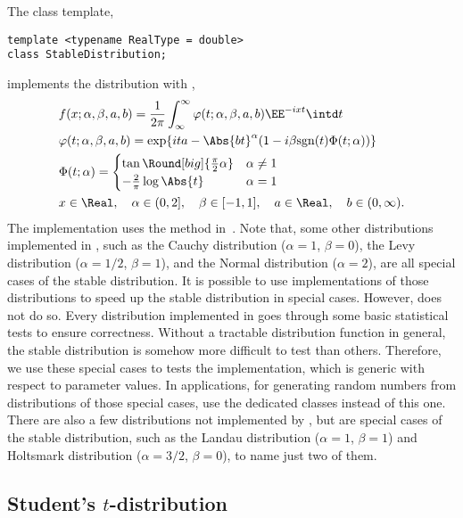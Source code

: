 The class template,
\begin{verbatim}
template <typename RealType = double>
class StableDistribution;
\end{verbatim}
implements the distribution with \pdf,
\begin{align*}
  &f(x;\alpha,\beta,a,b) =
  \frac{1}{2\pi}\int_{\infty}^{\infty}
  \varphi(t;\alpha,\beta,a,b)\EE^{-ixt}\intd t\\
  &\varphi(t;\alpha,\beta,a,b) =
  \exp\{ita - \Abs{bt}^{\alpha}(1 - i\beta\mathrm{sgn}(t)\Phi(t;\alpha))\} \\
  &\Phi(t;\alpha) = \begin{cases}
    \tan\Round[big]{\frac{\pi}{2}\alpha} & \alpha \ne 1 \\
    -\frac{2}{\pi}\log\Abs{t}            & \alpha = 1
  \end{cases} \\
  & x \in \Real,\quad
  \alpha \in (0, 2],\quad \beta \in [-1, 1],\quad
  a \in \Real,\quad b \in (0, \infty).
\end{align*}
The implementation uses the method in~\cite{Chambers:1976dv}. Note that, some
other distributions implemented in \mckl, such as the Cauchy distribution
($\alpha = 1$, $\beta = 0$), the Levy distribution ($\alpha = 1/2$, $\beta =
1$), and the Normal distribution ($\alpha = 2$), are all special cases of the
stable distribution. It is possible to use implementations of those
distributions to speed up the stable distribution in special cases. However,
\mckl does not do so. Every distribution implemented in \mckl goes through some
basic statistical tests to ensure correctness. Without a tractable distribution
function in general, the stable distribution is somehow more difficult to test
than others. Therefore, we use these special cases to tests the implementation,
which is generic with respect to parameter values. In applications, for
generating random numbers from distributions of those special cases, use the
dedicated classes instead of this one. There are also a few distributions not
implemented by \mckl, but are special cases of the stable distribution, such as
the Landau distribution ($\alpha = 1$, $\beta = 1$) and Holtsmark distribution
($\alpha = 3/2$, $\beta = 0$), to name just two of them.

\subsection{Student's \texorpdfstring{$t$}{t}-distribution}
\label{sub:Student's t-distribution}

